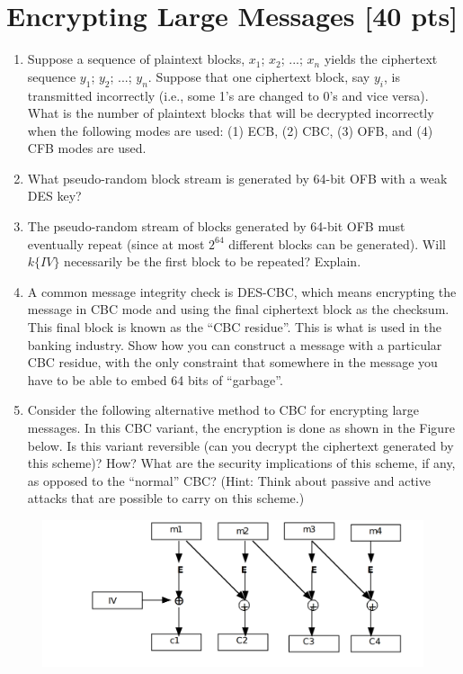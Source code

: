\documentclass[11pt]{article}
\begin{document}
\section{Encrypting Large Messages [40 pts]}
\begin{enumerate}
\item Suppose a sequence of plaintext blocks, $x_1$; $x_2$; ...; $x_n$ yields the ciphertext sequence $y_1$; $y_2$; ...; $y_n$. Suppose that one ciphertext block, say $y_i$, is transmitted incorrectly (i.e., some 1's are changed to 0's and vice versa). What is the number of plaintext blocks that will be decrypted incorrectly when the following modes are used: (1) ECB, (2) CBC, (3) OFB, and (4) CFB modes are used.
	
\item What pseudo-random block stream is generated by 64-bit OFB with a weak DES key?

\item The pseudo-random stream of blocks generated by 64-bit OFB must eventually repeat (since at most $2^{64}$ different blocks can be generated). Will $k\{IV\}$ necessarily be the first block to be repeated? Explain.
	
\item A common message integrity check is DES-CBC, which means encrypting the message in CBC mode and using the final ciphertext block as the checksum. This final block is known as the ``CBC residue''. This is what is used in the banking industry. Show how you can construct a message with a particular CBC residue, with the only constraint that somewhere in the message you have to be able to embed 64 bits of ``garbage''.

\item Consider the following alternative method to CBC for encrypting large messages. In this CBC variant, the encryption is done as shown in the Figure below. Is this variant reversible (can you decrypt the ciphertext generated by this scheme)? How? What are the security implications of this scheme, if any, as opposed to the ``normal'' CBC? (Hint: Think about passive and active attacks that are possible to carry on this scheme.)
\end{enumerate}

\begin{figure}
\includegraphics[width=6in]{cbc_variant.png}
\centering
\end{figure}
\end{document}
